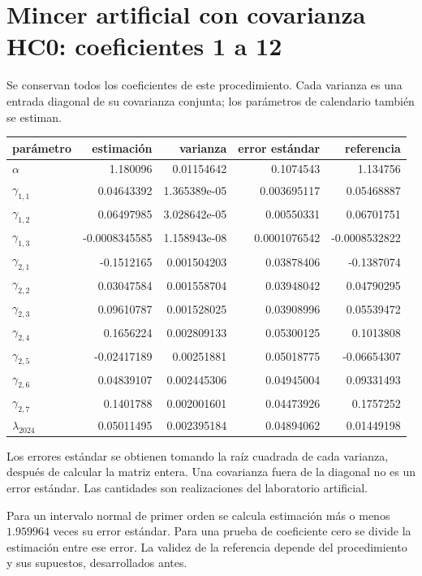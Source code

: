 \documentclass[11pt,a4paper]{article}
\begin{document}
\section{Mincer artificial con covarianza HC0: coeficientes 1 a 12}
Se conservan todos los coeficientes de este procedimiento. Cada varianza es una entrada diagonal de su covarianza conjunta; los parámetros de calendario también se estiman.
\begin{center}\small
\begin{tabular}{lrrrr}
\toprule
parámetro & estimación & varianza & error estándar & referencia\\\midrule
$\alpha$ & 1.180096 & 0.01154642 & 0.1074543 & 1.134756\\
$\gamma_{1,1}$ & 0.04643392 & 1.365389e-05 & 0.003695117 & 0.05468887\\
$\gamma_{1,2}$ & 0.06497985 & 3.028642e-05 & 0.00550331 & 0.06701751\\
$\gamma_{1,3}$ & -0.0008345585 & 1.158943e-08 & 0.0001076542 & -0.0008532822\\
$\gamma_{2,1}$ & -0.1512165 & 0.001504203 & 0.03878406 & -0.1387074\\
$\gamma_{2,2}$ & 0.03047584 & 0.001558704 & 0.03948042 & 0.04790295\\
$\gamma_{2,3}$ & 0.09610787 & 0.001528025 & 0.03908996 & 0.05539472\\
$\gamma_{2,4}$ & 0.1656224 & 0.002809133 & 0.05300125 & 0.1013808\\
$\gamma_{2,5}$ & -0.02417189 & 0.00251881 & 0.05018775 & -0.06654307\\
$\gamma_{2,6}$ & 0.04839107 & 0.002445306 & 0.04945004 & 0.09331493\\
$\gamma_{2,7}$ & 0.1401788 & 0.002001601 & 0.04473926 & 0.1757252\\
$\lambda_{2024}$ & 0.05011495 & 0.002395184 & 0.04894062 & 0.01449198\\
\bottomrule
\end{tabular}\end{center}

Los errores estándar se obtienen tomando la raíz cuadrada de cada varianza, después de calcular la matriz entera. Una covarianza fuera de la diagonal no es un error estándar. Las cantidades son realizaciones del laboratorio artificial.

Para un intervalo normal de primer orden se calcula estimación más o menos $1.959964$ veces su error estándar. Para una prueba de coeficiente cero se divide la estimación entre ese error. La validez de la referencia depende del procedimiento y sus supuestos, desarrollados antes.
\end{document}
